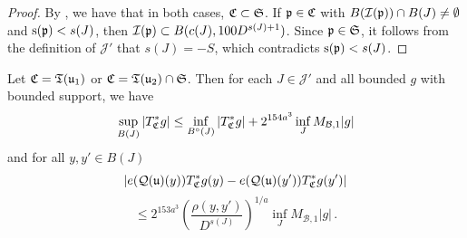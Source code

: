     \begin{proof}
        \leanok
        By , we have that in both cases, ${\mathfrak C} \subset \mathfrak{S}$. If ${\mathfrak p} \in {\mathfrak C}$ with $B({\mathcal{I}}({\mathfrak p})) \cap B(J) \neq \emptyset$ and ${\mathrm{s}}({\mathfrak p}) < s(J)$, then ${\mathcal{I}}({\mathfrak p}) \subset B(c(J), 100 D^{s(J) + 1})$. Since ${\mathfrak p} \in \mathfrak{S}$, it follows from the definition of $\mathcal{J}'$ that $s(J) = -S$, which contradicts ${\mathrm{s}}({\mathfrak p}) < s(J)$.
    \end{proof}

    \begin{lemma}
        \label{global-tree-control-1}
        \leanok
        Let ${\mathfrak C} = {\mathfrak T}({\mathfrak u}_1)$ or ${\mathfrak C} = {\mathfrak T}({\mathfrak u}_2) \cap \mathfrak{S}$. Then for each $J \in \mathcal{J}'$ and all bounded $g$ with bounded support, we have
        \begin{align}
            \label{TreeUB}
            \sup_{B(J)} |T_{{\mathfrak C}}^*g| \leq \inf_{B^\circ{}(J)} |T^*_{{\mathfrak C}} g| + 2^{154a^3} \inf_{J} M_{\mathcal{B}, 1} |g|
        \end{align}
        and for all $y,y' \in B(J)$
        $$
            |e({\mathcal{Q}}({\mathfrak u})(y)) T_{{\mathfrak C}}^* g(y) - e({\mathcal{Q}}({\mathfrak u})(y')) T_{{\mathfrak C}}^* g(y')|
        $$
        \begin{equation}
            \label{TreeHolder}
             \le 2^{153a^3} \left(\frac{\rho(y,y')}{D^{s(J)}}\right)^{1/a} \inf_J M_{\mathcal{B},1} |g|\,.
        \end{equation}
    \end{lemma}

